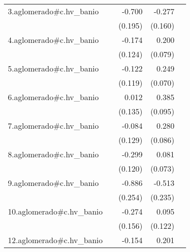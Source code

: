 {\begin{longtable}{l*{4}{D{.}{.}{-1}}}
\addlinespace
3.aglomerado#c.hv\_banio&                     &      -0.700\sym{***}&      -0.277         &                     \\
            &                     &     (0.195)         &     (0.160)         &                     \\
\addlinespace
4.aglomerado#c.hv\_banio&                     &      -0.174         &       0.200\sym{*}  &                     \\
            &                     &     (0.124)         &     (0.079)         &                     \\
\addlinespace
5.aglomerado#c.hv\_banio&                     &      -0.122         &       0.249\sym{***}&                     \\
            &                     &     (0.119)         &     (0.070)         &                     \\
\addlinespace
6.aglomerado#c.hv\_banio&                     &       0.012         &       0.385\sym{***}&                     \\
            &                     &     (0.135)         &     (0.095)         &                     \\
\addlinespace
7.aglomerado#c.hv\_banio&                     &      -0.084         &       0.280\sym{**} &                     \\
            &                     &     (0.129)         &     (0.086)         &                     \\
\addlinespace
8.aglomerado#c.hv\_banio&                     &      -0.299\sym{*}  &       0.081         &                     \\
            &                     &     (0.120)         &     (0.073)         &                     \\
\addlinespace
9.aglomerado#c.hv\_banio&                     &      -0.886\sym{***}&      -0.513\sym{*}  &                     \\
            &                     &     (0.254)         &     (0.235)         &                     \\
\addlinespace
10.aglomerado#c.hv\_banio&                     &      -0.274         &       0.095         &                     \\
            &                     &     (0.156)         &     (0.122)         &                     \\
\addlinespace
12.aglomerado#c.hv\_banio&                     &      -0.154         &       0.201         &                     \\

\end{longtable}}
